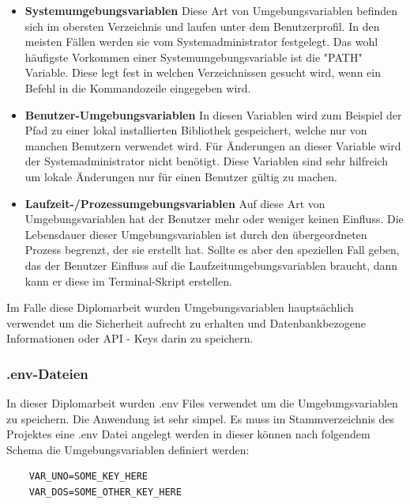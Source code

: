 \begin{itemize}
    \item \textbf{Systemumgebungsvariablen}
        \newline
        Diese Art von Umgebungsvariablen befinden sich im obersten Verzeichnis und laufen unter dem Benutzerprofil. In den meisten Fällen werden sie vom Systemadministrator festgelegt. Das wohl häufigste Vorkommen einer Systemumgebungsvariable ist die "PATH" Variable. Diese legt fest in welchen Verzeichnissen gesucht wird, wenn ein Befehl in die Kommandozeile eingegeben wird.
        \cite{path_setzen}
        
    \item \textbf{Benutzer-Umgebungsvariablen}
        \newline
        In diesen Variablen wird zum Beispiel der Pfad zu einer lokal installierten Bibliothek gespeichert, welche nur von manchen Benutzern verwendet wird. Für Änderungen an dieser Variable wird der Systemadministrator nicht benötigt. Diese Variablen sind sehr hilfreich um lokale Änderungen nur für einen Benutzer gültig zu machen.
    \item \textbf{Laufzeit-/Prozessumgebungsvariablen}
        \newline
        Auf diese Art von Umgebungsvariablen hat der Benutzer mehr oder weniger keinen Einfluss. Die Lebensdauer dieser Umgebungsvariablen ist durch den übergeordneten Prozess begrenzt, der sie erstellt hat.
        Sollte es aber den speziellen Fall geben, das der Benutzer Einfluss auf die Laufzeitumgebungsvariablen braucht, dann kann er diese im Terminal-Skript erstellen.
\end{itemize}

Im Falle diese Diplomarbeit wurden Umgebungsvariablen hauptsächlich verwendet um die Sicherheit aufrecht zu erhalten und Datenbankbezogene Informationen oder API - Keys darin zu speichern.

\subsubsection{.env-Dateien}
In dieser Diplomarbeit wurden .env Files verwendet um die Umgebungsvariablen zu speichern. Die Anwendung ist sehr simpel. Es muss im Stammverzeichnis des Projektes eine .env Datei angelegt werden in dieser können nach folgendem Schema die Umgebungsvariablen definiert werden:
\begin{verbatim}
    VAR_UNO=SOME_KEY_HERE
    VAR_DOS=SOME_OTHER_KEY_HERE
\end{verbatim}


